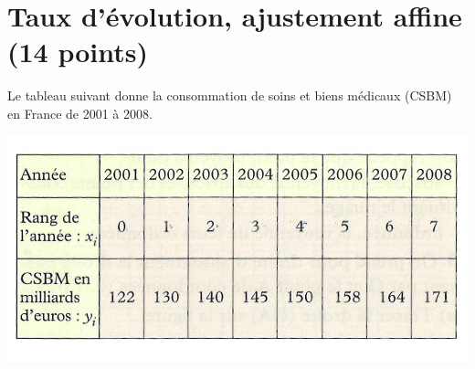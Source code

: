 \section{Taux d'évolution, ajustement affine (14 points)}

Le tableau suivant donne la consommation de soins et biens médicaux (CSBM) en France de 2001 à 2008.

\begin{center}
	\includegraphics[scale=1.2]{csbm}
\end{center}

